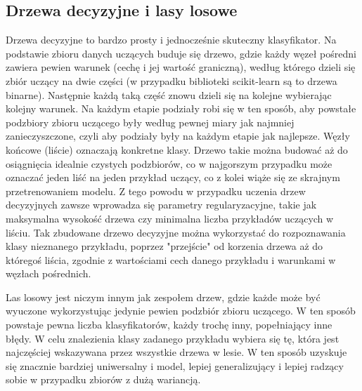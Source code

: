 \documentclass{classrep}
\begin{document}
{        \subsection{Drzewa decyzyjne i lasy losowe}
        \label{drzewa_decyzyjne_intro} {
        Drzewa decyzyjne to bardzo prosty i jednocześnie skuteczny klasyfikator. Na podstawie zbioru danych uczących buduje się drzewo, gdzie każdy węzeł pośredni zawiera pewien warunek (cechę i jej wartość graniczną), według którego dzieli się zbiór uczący na dwie części (w przypadku biblioteki scikit-learn są to drzewa binarne). Następnie każdą taką część znowu dzieli się na kolejne wybierając kolejny warunek. Na każdym etapie podziały robi się w ten sposób, aby powstałe podzbiory zbioru uczącego były według pewnej miary jak najmniej zanieczyszczone, czyli aby podziały były na każdym etapie jak najlepsze. Węzły końcowe (liście) oznaczają konkretne klasy. Drzewo takie można budować aż do osiągnięcia idealnie czystych podzbiorów, co w najgorszym przypadku może oznaczać jeden liść na jeden przykład uczący, co z kolei wiąże się ze skrajnym przetrenowaniem modelu. Z tego powodu w przypadku uczenia drzew decyzyjnych zawsze wprowadza się parametry regularyzacyjne, takie jak maksymalna wysokość drzewa czy minimalna liczba przykładów uczących w liściu. Tak zbudowane drzewo decyzyjne można wykorzystać do rozpoznawania klasy nieznanego przykładu, poprzez "przejście" od korzenia drzewa aż do któregoś liścia, zgodnie z wartościami cech danego przykładu i warunkami w węzłach pośrednich.
        
        Las losowy jest niczym innym jak zespołem drzew, gdzie każde może być wyuczone wykorzystując jedynie pewien podzbiór zbioru uczącego. W ten sposób powstaje pewna liczba klasyfikatorów, każdy trochę inny, popełniający inne błędy. W celu znalezienia klasy zadanego przykładu wybiera się tę, która jest najczęściej wskazywana przez wszystkie drzewa w lesie. W ten sposób uzyskuje się znacznie bardziej uniwersalny i model, lepiej generalizujący i lepiej radzący sobie w przypadku zbiorów z dużą wariancją.
        }
    }
    \newpage
    
\end{document}

